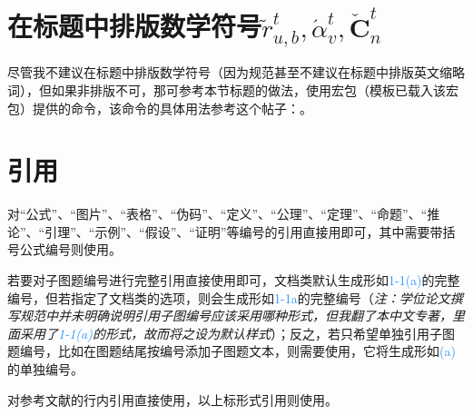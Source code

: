 \section{在标题中排版数学符号\texorpdfstring{$\tilde{r}^t_{u,b}, \acute{\alpha}^t_v, \check{\boldsymbol{C}}^t_n$}{示例}}

尽管我不建议在标题中排版数学符号（因为规范甚至不建议在标题中排版英文缩略词），但如果非排版不可，那可参考本节标题的做法，使用\href{https://mirrors.tuna.tsinghua.edu.cn/CTAN/macros/latex/contrib/hyperref/doc/hyperref-doc.pdf}{\ttfamily\color{DarkRed}}宏包（模板已载入该宏包）提供的命令，该命令的具体用法参考这个帖子：\href{https://blog.csdn.net/qq_42679415/article/details/139592054}{\ttfamily\color{DarkRed}}。

\section{引用}

对“公式”、“图片”、“表格”、“伪码”、“定义”、“公理”、“定理”、“命题”、“推论”、“引理”、“示例”、“假设”、“证明”等编号的引用直接用即可，其中需要带括号公式编号则使用。

若要对子图题编号进行完整引用直接使用即可，文档类默认生成形如\textcolor{DodgerBlue}{1-1(a)}的完整编号，但若指定了文档类的选项，则会生成形如\textcolor{DodgerBlue}{1-1a}的完整编号（\textit{注：学位论文撰写规范中并未明确说明引用子图编号应该采用哪种形式，但我翻了本中文专著，里面采用了\textcolor{DodgerBlue}{1-1(a)}的形式，故而将之设为默认样式}）；反之，若只希望单独引用子图题编号，比如在图题结尾按编号添加子图题文本，则需要使用，它将生成形如\textcolor{DodgerBlue}{(a)}的单独编号。

对参考文献的行内引用直接使用，以上标形式引用则使用。






